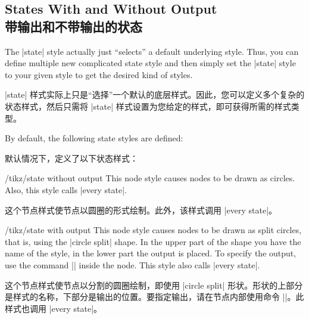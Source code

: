 \subsection{States With and Without Output\\带输出和不带输出的状态}

The |state| style actually just ``selects'' a default underlying style. Thus,
you can define multiple new complicated state style and then simply set the
|state| style to your given style to get the desired kind of styles.

|state| 样式实际上只是“选择”一个默认的底层样式。因此，您可以定义多个复杂的状态样式，然后只需将 |state| 样式设置为您给定的样式，即可获得所需的样式类型。

By default, the following state styles are defined:

默认情况下，定义了以下状态样式：

%
\begin{stylekey}{/tikz/state without output}
    This node style causes nodes to be drawn as circles. Also, this style calls
    |every state|.

    这个节点样式使节点以圆圈的形式绘制。此外，该样式调用 |every state|。

\end{stylekey}

\begin{stylekey}{/tikz/state with output}
    This node style causes nodes to be drawn as split circles, that is, using
    the |circle split| shape. In the upper part of the shape you have the name
    of the style, in the lower part the output is placed. To specify the
    output, use the command || inside the node. This style also
    calls |every state|.
    
    这个节点样式使节点以分割的圆圈绘制，即使用 |circle split| 形状。形状的上部分是样式的名称，下部分是输出的位置。要指定输出，请在节点内部使用命令 ||。此样式也调用 |every state|。


\begin{codeexample}[preamble={\usetikzlibrary{automata}}]
\end{codeexample}
\end{stylekey}

